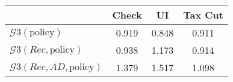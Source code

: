 \begin{tabular}{@{}lccc@{}} 
\toprule 
                          & Check      & UI    & Tax Cut    \\  \midrule 
$\mathcal{G}3(\text{policy})$ & 0.919  & 0.848  & 0.911     \\ 
$\mathcal{G}3(Rec,\text{policy})$ & 0.938  & 1.173  & 0.914     \\ 
$\mathcal{G}3(Rec, AD,\text{policy})$ & 1.379  & 1.517  & 1.098     \\ 
\end{tabular}  
